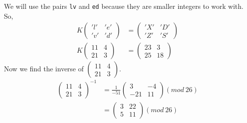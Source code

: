 \documentclass[10pt,letterpaper]{report}
\begin{document}
\begin{enumerate}
	We will use the pairs \verb|lv| and \verb|ed| because they are smaller integers to
	work with. So,
	\begin{align*}
		K \begin{pmatrix} 'l' & 'e' \\ 'v' & 'd' \end{pmatrix} &=
	\begin{pmatrix} 'X' & 'D' \\ 'Z' & 'S'	\end{pmatrix}
	\\
	K \begin{pmatrix} 11 & 4 \\ 21 & 3	\end{pmatrix} &=
	\begin{pmatrix} 23 & 3 \\ 25 & 18	\end{pmatrix}
	\end{align*}
	Now we find the inverse of $\begin{pmatrix} 11 & 4 \\ 21 & 3 \end{pmatrix}$.
	\begin{align*}
	\begin{pmatrix} 11 & 4 \\ 21 & 3	\end{pmatrix}^{-1} &= 
	\frac{1}{-51}\begin{pmatrix}
	3 & -4 \\ -21 & 11 
	\end{pmatrix} (mod\ 26)	 \\
	&= \begin{pmatrix}
	3 & 22 \\ 5 & 11
	\end{pmatrix} (mod\ 26)	
	\end{align*}
	

\end{enumerate}
\end{document}

